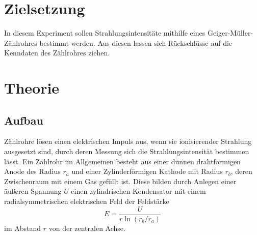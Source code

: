 \section{Zielsetzung}
In diesem Experiment sollen Strahlungsintensitäte mithilfe eines Geiger-Müller-Zählrohres bestimmt werden. Aus diesen lassen sich Rückschlüsse auf die Kenndaten des Zählrohres ziehen.
\section{Theorie}
\subsection{Aufbau}
Zählrohre lösen einen elektrischen Impuls aus, wenn sie ionisierender Strahlung ausgesetzt sind, durch deren Messung sich die Strahlungsintensität bestimmen lässt.
Ein Zählrohr im Allgemeinen besteht aus einer dünnen drahtförmigen Anode des Radius $r_a$ und einer Zylinderförmigen Kathode mit Radius $r_b$, deren Zwischenraum mit einem Gas gefüllt ist. Diese bilden durch Anlegen einer äußeren Spannung $U$ einen zylindrischen Kondensator mit einem radialsymmetrischen elektrischen Feld der Feldstärke
\begin{equation*}
E=\frac{U}{r\ln(r_b/r_a)}
\end{equation*}
im Abstand $r$ von der zentralen Achse.
